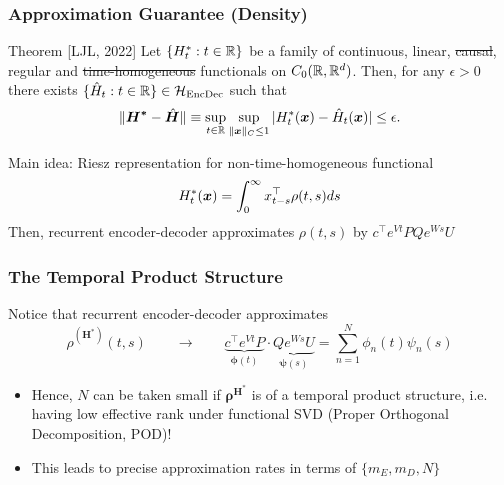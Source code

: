 \begin{frame}
	\frametitle{Approximation Guarantee (Density)}

	\begin{alertblock}{Theorem [LJL, 2022]}
		Let $\{ H^*_t : t\in\mathbb{R} \}$ be a family of continuous,
		linear, \sout{causal}, regular and \sout{time-homogeneous} functionals
		on $C_0(\mathbb{R},\mathbb{R}^d)$.
		Then, for any $\epsilon > 0$ there exists $\{ \hat{H}_t : t\in \mathbb{R} \} \in \mathcal H_{\text{EncDec}}$ such that
		\begin{equation*}
			\| \bm {H^*} - \hat{\bm H} \|
			\equiv
			\sup_{t\in\mathbb{R}}
			\sup_{\| \boldsymbol{x} \|_C \leq 1}
			|
			H^*_t(\boldsymbol{x}) - \hat{H}_t(\boldsymbol{x})
			|
			\leq \epsilon.
		\end{equation*}
	\end{alertblock}

	Main idea: Riesz representation for non-time-homogeneous functional
	\begin{equation*}
		H^*_t(\boldsymbol{x}) =
		\int_{0}^{\infty}
		x_{t-s}^\top \rho(t,s) ds
	\end{equation*}
	Then, recurrent encoder-decoder approximates $\rho(t,s)$ by
	$c^\top e^{Vt} PQe^{W s} U$


\end{frame}

\begin{frame}
	\frametitle{The Temporal Product Structure}

	Notice that recurrent encoder-decoder approximates
	\begin{equation*}
		\rho^{(\bm H^*)}(t,s)
		\qquad
		\rightarrow
		\qquad
		\underbrace{
			c^\top e^{Vt}P
		}_{
			{\bm \phi}(t)
		}
		\cdot
		\underbrace{
			Qe^{W s} U
		}_{
			{\bm \psi}(s)
		}
		=
		\sum_{n=1}^{N}
		\phi_n(t) \psi_n(s)
	\end{equation*}
	\begin{itemize}[<+->]
		\item
		Hence, $N$ can be taken small if ${\bm \rho}^{\bm H^*}$
		is of a \alert{temporal product structure}, i.e.
		having low effective rank under functional SVD
		(Proper Orthogonal Decomposition, POD)!
		\item
		This leads to precise approximation rates in terms of
		$\{m_E, m_D,N\}$ 
	\end{itemize}


\end{frame}

